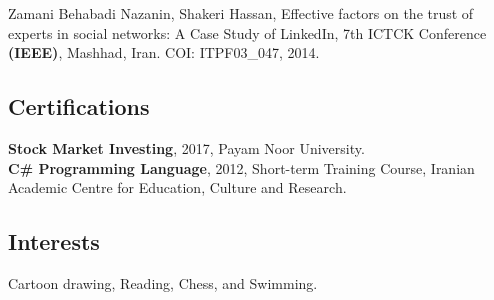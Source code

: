 \documentclass[10pt]{article}
\begin{document}
 Zamani Behabadi Nazanin, Shakeri Hassan, Effective factors on the trust of experts in social networks: A Case Study of LinkedIn, 7th ICTCK Conference\textbf{ (IEEE)}, Mashhad, Iran. COI:  ITPF03\_047, 2014.

\subsection*{Certifications}
\noindent \textbf{Stock Market Investing}, 2017, Payam Noor University.\\
\noindent \textbf{C\# Programming Language}, 2012, Short-term Training Course, Iranian Academic Centre for Education, Culture and Research.

\subsection*{Interests}
Cartoon drawing, Reading, Chess, and Swimming.
\end{document}
